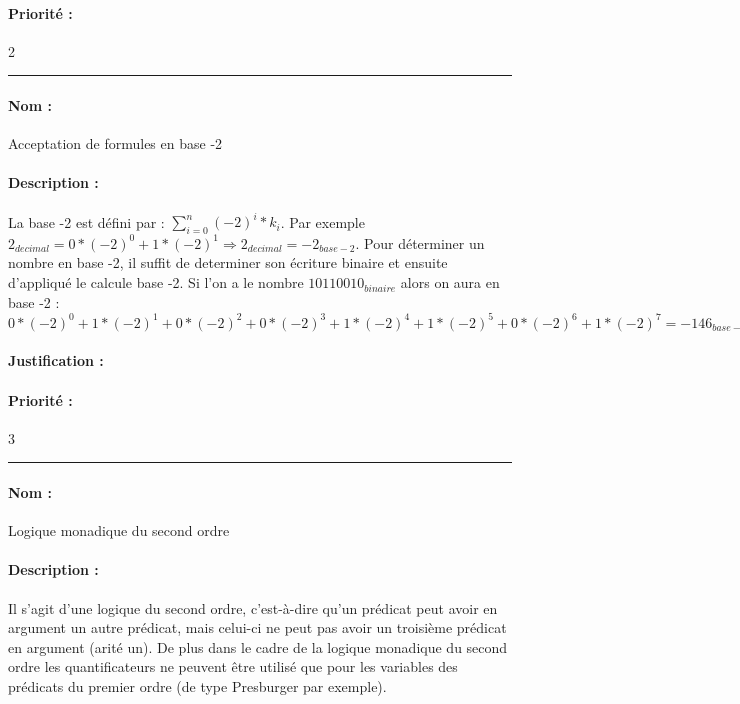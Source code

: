 \documentclass{article}%
\begin{document}
\paragraph{Priorité :} 2\\

\rule{\linewidth}{1pt}

\paragraph{Nom :} Acceptation de formules en base -2

\paragraph{Description :} La base -2 est défini par : $ \sum\limits_{i=0}^n (-2)^i * k_i$. Par exemple $2_{decimal} = 0 * (-2)^0 + 1 * (-2)^1 \Rightarrow 2_{decimal} = -2_{base - 2}$. Pour déterminer un nombre en base -2, il suffit de determiner son écriture binaire et ensuite d'appliqué le calcule base -2. Si l'on a le nombre $10110010_{binaire}$ alors on aura en base -2 : $0 * (-2)^0 + 1 * (-2)^1 + 0 * (-2)^2 + 0 * (-2)^3 + 1 * (-2)^4 + 1 * (-2)^5 + 0 * (-2)^6 + 1 * (-2)^7 = -146_{base - 2}$

\paragraph{Justification :}

\paragraph{Priorité :} 3\\

\rule{\linewidth}{1pt}

\paragraph{Nom :} Logique monadique du second ordre

\paragraph{Description :} Il s'agit d'une logique du second ordre, c'est-à-dire qu'un prédicat peut avoir en argument un autre prédicat, mais celui-ci ne peut pas avoir un troisième prédicat en argument (arité un). De plus dans le cadre de la logique monadique du second ordre les quantificateurs ne peuvent être utilisé que pour les variables des prédicats du premier ordre (de type Presburger par exemple).
\end{document}
